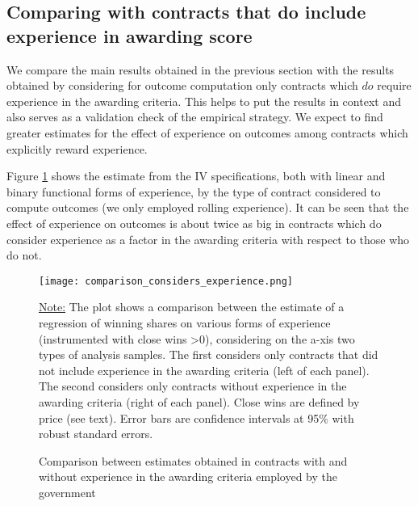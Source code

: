 



\clearpage

\subsection{Comparing with contracts that do include experience in awarding score}

We compare the main results obtained in the previous section with the results obtained by considering for outcome computation only contracts which $do$ require experience in the awarding criteria. This helps to put the results in context and also serves as a validation check of the empirical strategy. We expect to find greater estimates for the effect of experience on outcomes among contracts which explicitly reward experience.

Figure \ref{fig:comparison_considers_experience} shows the estimate from the IV specifications, both with linear and binary functional forms of experience, by the type of contract considered to compute outcomes (we only employed rolling experience). It can be seen that the effect of experience on outcomes is about twice as big in contracts which do consider experience as a factor in the awarding criteria with respect to those who do not.

\begin{figure}[H]
  \caption{Comparison between estimates obtained in contracts with and without experience in the awarding criteria employed by the government}
  \texttt{[image: comparison\_considers\_experience.png]}

  \vskip 0.5mm
  {\noindent\justifying\footnotesize\underline{Note:} The plot shows a comparison between the estimate of a regression of winning shares on various forms of experience (instrumented with close wins >0), considering on the a-xis two types of analysis samples. The first considers only contracts that did not include experience in the awarding criteria (left of each panel). The second considers only contracts without experience in the awarding criteria (right of each panel). Close wins are defined by price (see text). Error bars are confidence intervals at 95\% with robust standard errors. \par}
  \label{fig:comparison_considers_experience}
\end{figure}

